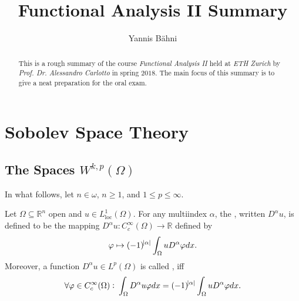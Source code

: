 

\setcounter{section}{1}

\title{Functional Analysis II Summary}
\author{Yannis B\"{a}hni}
\address[Yannis B\"{a}hni]{University of Zurich, R\"{a}mistrasse 71, 8006 Zurich}



\begin{abstract}
	This is a rough summary of the course \emph{Functional Analysis II} held at \emph{ETH Zurich} by \emph{Prof. Dr. Alessandro Carlotto} in spring $2018$. The main focus of this summary is to give a neat preparation for the oral exam.
\end{abstract}

\maketitle

\tableofcontents

\section*{Sobolev Space Theory}
\subsection*{The Spaces $W^{k,p}(\Omega)$}
In what follows, let $n \in \omega$, $n \geq 1$, and $1 \leq p \leq \infty$.

\begin{definition}
	Let $\Omega \subseteq \mathbb{R}^n$ open and $u \in L^1_{\mathrm{loc}}(\Omega)$. For any multiindex $\alpha$, the , written $D^\alpha u$, is defined to be the mapping $D^\alpha u : C^\infty_c(\Omega) \to \mathbb{R}$ defined by
	\begin{equation*}
		\varphi \mapsto (-1)^{\abs{\alpha}}\int_\Omega u D^\alpha \varphi dx.
	\end{equation*}
	Moreover, a function $D^\alpha u \in L^p(\Omega)$ is called , iff
	\begin{equation*}
		\forall \varphi \in C^\infty_c(\Omega): \> \int_\Omega D^\alpha u \varphi dx =  (-1)^{\abs{\alpha}} \int_\Omega u D^\alpha \varphi dx.
	\end{equation*}
\end{definition}

